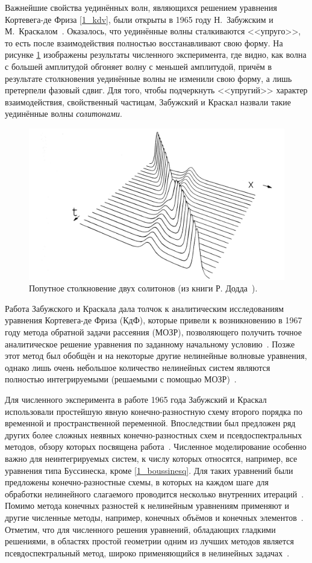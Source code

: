 \documentclass[12pt, a4paper]{report}
\begin{document}
Важнейшие свойства уединённых волн, являющихся решением уравнения Кортевега-де Фриза \eqref{1_kdv}, были открыты в 1965 году Н.~Забужским и М.~Краскалом~\cite{Zabusky}. Оказалось, что уединённые волны сталкиваются <<упруго>>, то есть после взаимодействия полностью восстанавливают свою форму.
На рисунке \ref{fig:kdv_collision} изображены результаты численного эксперимента, где видно, как волна с большей амплитудой обгоняет волну с меньшей амплитудой, причём в результате столкновения уединённые волны не изменили свою форму, а лишь претерпели фазовый сдвиг.
Для того, чтобы подчеркнуть <<упругий>> характер взаимодействия, свойственный частицам, Забужский и Краскал назвали такие уединённые волны \emph{солитонами}. 
\begin{figure}[h]
	\centering
	\includegraphics[width=0.6\linewidth]{kdv_collision.png}
	\caption{Попутное столкновение двух солитонов (из книги Р. Додда~\cite{Dodd}).}
	\label{fig:kdv_collision}
\end{figure}

Работа Забужского и Краскала дала толчок к аналитическим исследованиям уравнения Кортевега-де Фриза (КдФ), которые привели к возникновению в 1967 году метода обратной задачи рассеяния (МОЗР), позволяющего получить точное аналитическое решение уравнения по заданному начальному условию~\cite{GardnerIST}. Позже этот метод был обобщён и на некоторые другие нелинейные волновые уравнения, однако лишь очень небольшое количество нелинейных систем являются полностью интегрируемыми (решаемыми с помощью МОЗР)~\cite{Zakharov}.

Для численного эксперимента в работе 1965 года Забужский и Краскал использовали простейшую явную конечно-разностную схему второго порядка по временной и пространственной переменной. Впоследствии был предложен ряд других более сложных неявных конечно-разностных схем и псевдоспектральных методов, обзору которых посвящена работа~\cite{Taha}. Численное моделирование особенно важно для неинтегрируемых систем, к числу которых относятся, например, все уравнения типа Буссинеска, кроме \eqref{1_boussinesq}. Для таких уравнений были предложены конечно-разностные схемы, в которых на каждом шаге для обработки нелинейного слагаемого проводится несколько внутренних итераций~\cite{Christov, Kolkovska}.
Помимо метода конечных разностей к нелинейным уравнениям применяют и другие численные методы, например, конечных объёмов и конечных элементов~\cite{Dutykh_Boussinesq, Karczewska}. Отметим, что для численного решения уравнений, обладающих гладкими решениями, в областях простой геометрии одним из лучших методов является псевдоспектральный метод, широко применяющийся в нелинейных задачах~\cite{Gottlieb_Orszag}.
\end{document}
